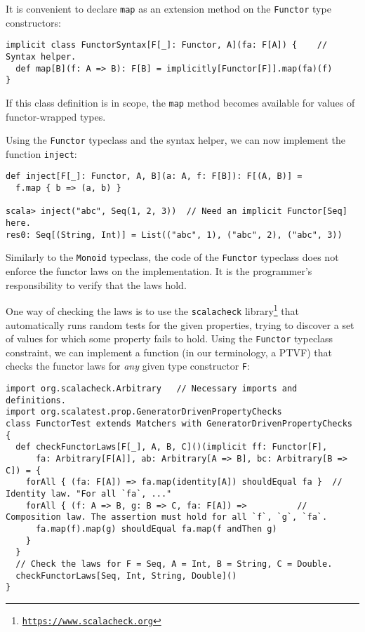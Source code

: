 It is convenient to declare \lstinline!map! as an extension method
on the \lstinline!Functor! type constructors:
\begin{lstlisting}
implicit class FunctorSyntax[F[_]: Functor, A](fa: F[A]) {    // Syntax helper.
  def map[B](f: A => B): F[B] = implicitly[Functor[F]].map(fa)(f)
}
\end{lstlisting}
If this class definition is in scope, the \lstinline!map! method
becomes available for values of functor-wrapped types.

Using the \lstinline!Functor! typeclass and the syntax helper, we
can now implement the function \lstinline!inject!:
\begin{lstlisting}
def inject[F[_]: Functor, A, B](a: A, f: F[B]): F[(A, B)] =
  f.map { b => (a, b) }

scala> inject("abc", Seq(1, 2, 3))  // Need an implicit Functor[Seq] here.
res0: Seq[(String, Int)] = List(("abc", 1), ("abc", 2), ("abc", 3))
\end{lstlisting}
 Similarly to the \lstinline!Monoid! typeclass, the code of the \lstinline!Functor!
typeclass does not enforce the functor laws on the implementation.
It is the programmer\textsf{'}s responsibility to verify that the laws hold.

One way of checking the laws is to use the \texttt{scalacheck} library\footnote{\texttt{\href{https://www.scalacheck.org}{https://www.scalacheck.org}}}
that automatically runs random tests for the given properties, trying
to discover a set of values for which some property fails to hold.
Using the \lstinline!Functor! typeclass constraint, we can implement
a function (in our terminology, a PTVF) that checks the functor laws
for \emph{any} given type constructor \lstinline!F!:
\begin{lstlisting}
import org.scalacheck.Arbitrary   // Necessary imports and definitions.
import org.scalatest.prop.GeneratorDrivenPropertyChecks
class FunctorTest extends Matchers with GeneratorDrivenPropertyChecks {
  def checkFunctorLaws[F[_], A, B, C]()(implicit ff: Functor[F],
      fa: Arbitrary[F[A]], ab: Arbitrary[A => B], bc: Arbitrary[B => C]) = {
    forAll { (fa: F[A]) => fa.map(identity[A]) shouldEqual fa }  // Identity law. "For all `fa`, ..."
    forAll { (f: A => B, g: B => C, fa: F[A]) =>          // Composition law. The assertion must hold for all `f`, `g`, `fa`.
      fa.map(f).map(g) shouldEqual fa.map(f andThen g)
    }
  }
  // Check the laws for F = Seq, A = Int, B = String, C = Double.
  checkFunctorLaws[Seq, Int, String, Double]()
}
\end{lstlisting}


